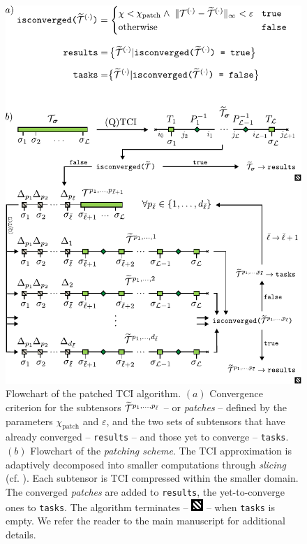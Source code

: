 \begin{figure}[ht!]
	\includegraphics{figures/PatchingAlgorithm.pdf}
	\caption{Flowchart of the patched TCI algorithm. $(a)$ Convergence criterion for the subtensors $\widetilde{\mathcal{T}}^{p_1,\dots,p_{\bar \ell}}$ -- or \textit{patches} -- defined by the parameters $\chi_{\text{patch}}$ and $\varepsilon$, and the two sets of subtensors that have already converged -- \texttt{results} -- and those yet to converge  -- \texttt{tasks}. $(b)$ Flowchart of the \textit{patching scheme}. The TCI approximation is adaptively decomposed into smaller computations through \textit{slicing} (cf. ). Each subtensor is TCI compressed within the smaller domain. The converged \textit{patches} are added to \texttt{results}, the yet-to-converge ones to \texttt{tasks}. The algorithm terminates -- \includegraphics[scale=0.95]{figures/TerminalSquare.pdf} -- when \texttt{tasks} is empty. We refer the reader to the main manuscript for additional details.}
	\label{fig:patchingAlg}
\end{figure}

